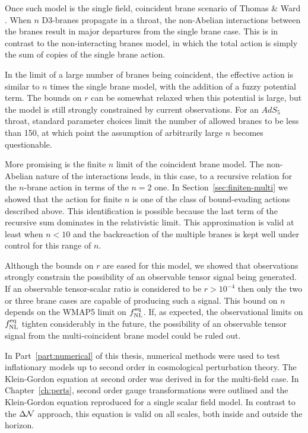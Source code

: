 Once such model is the single field, coincident brane scenario of
Thomas \& Ward \cite{thomasward}. When $n$ D3-branes propagate in a throat, the
non-Abelian interactions between the branes result in major departures from the
single brane case. This is in contrast to the non-interacting branes model, in which
the total action is simply the sum of copies of the single brane action.

In the limit of a large number of branes being coincident, the effective action is
similar to $n$ times the single brane model, with the addition of a fuzzy potential
term. The bounds on $r$ can be somewhat relaxed when this potential is large,
but the model is still strongly constrained by current observations. For an $AdS_5$
throat, standard parameter choices limit the number of allowed branes to be
less than 150, at which point the assumption of arbitrarily large $n$ becomes
questionable.

More promising is the finite $n$ limit of the coincident brane model. The
non-Abelian nature of the interactions leads, in this case, to a recursive relation for
the $n$-brane action in terms of the $n=2$ one. In
Section~\ref{sec:finiten-multi} we showed that the action for finite $n$ is one of
the class of bound-evading actions described above. This identification is possible
because the last term of the recursive sum dominates in the relativistic limit. This
approximation is valid at least when $n<10$ and the backreaction of the multiple
branes is kept well under control for this range of $n$.

Although the bounds on $r$ are eased
for this model, we showed that observations strongly constrain the possibility of
an observable tensor signal being generated. If an observable tensor-scalar ratio is
considered to be $r>10^{-4}$ then only the two or three brane cases are capable of
producing such a signal. This bound on $n$ depends on the WMAP5 limit on $f_{\mathrm{NL}}^{\mathrm{eq}}$.
If, as expected, the observational limits on $f_{\mathrm{NL}}^{\mathrm{eq}}$ tighten considerably in the
future, the possibility of an observable tensor signal from the multi-coincident
brane model could be ruled out.

In Part~\ref{part:numerical} of this thesis, numerical methods were used to test inflationary
models up to second order in cosmological perturbation theory. 
% 
% 
The Klein-Gordon equation at second order was derived in  for the
multi-field case. 
In Chapter~\ref{ch:perts}, second order gauge transformations were outlined
and the Klein-Gordon equation reproduced for a single scalar field model. In contrast
to the $\Delta \mathcal{N}$ approach, this equation is valid on all scales, both inside and
outside the horizon. 


